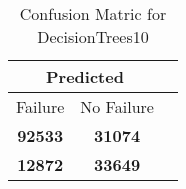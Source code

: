 \begin{table}[] 
\caption{Confusion Matric for DecisionTrees10} 
\label{Table: Prediction Accuracy-DMDDecisionTrees10OnlySunEKF-resetReflectionEKF-top2-Reflection} 
\centering 
\begin{tabular} 
 {@{}ccc@{}} 
\toprule 
\multicolumn{2}{c}{\textbf{Predicted}}
 \\ \midrule 
\multicolumn{1}{|c|}{Failure} & 
\multicolumn{1}{c|}{No Failure}
 \\ \midrule 
\multicolumn{1}{|c|}{\color{green}\textbf{92533}} & 
\multicolumn{1}{c|}{\color{red}\textbf{31074}}
 \\ \midrule 
\multicolumn{1}{|c|}{\color{red}\textbf{12872}} & 
\multicolumn{1}{c|}{\color{green}\textbf{33649}}
 \\ \bottomrule 
\end{tabular} 
\end{table} 
